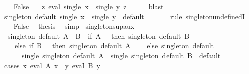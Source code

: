 \begin{isabellebody}
\ \ \isamarkupfalse%
\ False\ \isamarkupfalse%
\ {\isachardoublequoteopen}{\isasymnot}\ {\isacharparenleft}{\kern0pt}{\isasymexists}{\isacharbang}{\kern0pt}z{\isachardot}{\kern0pt}\ eval\ {\isacharparenleft}{\kern0pt}single\ x\ {\isasymsqunion}\ single\ y{\isacharparenright}{\kern0pt}\ z{\isacharparenright}{\kern0pt}{\isachardoublequoteclose}\isanewline
\ \ \ \ \isamarkupfalse%
\ blast\isanewline
\ \ \isamarkupfalse%
\ \isamarkupfalse%
\ {\isachardoublequoteopen}singleton\ default\ {\isacharparenleft}{\kern0pt}single\ x\ {\isasymsqunion}\ single\ y{\isacharparenright}{\kern0pt}\ {\isacharequal}{\kern0pt}\ default\ {\isacharparenleft}{\kern0pt}{\isacharparenright}{\kern0pt}{\isachardoublequoteclose}\isanewline
\ \ \ \ \isamarkupfalse%
\ {\isacharparenleft}{\kern0pt}rule\ singleton{\isacharunderscore}{\kern0pt}undefinedI{\isacharparenright}{\kern0pt}\isanewline
\ \ \isamarkupfalse%
\ False\ \isamarkupfalse%
\ {\isacharquery}{\kern0pt}thesis\ \isamarkupfalse%
\ simp\isanewline
{}\isamarkupfalse%
%
\endisatagproof
{\isafoldproof}%
%
\isadelimproof
\isanewline
%
\endisadelimproof
\isanewline
{}\isamarkupfalse%
\ singleton{\isacharunderscore}{\kern0pt}sup{\isacharunderscore}{\kern0pt}aux{\isacharcolon}{\kern0pt}\isanewline
\ \ {\isachardoublequoteopen}singleton\ default\ {\isacharparenleft}{\kern0pt}A\ {\isasymsqunion}\ B{\isacharparenright}{\kern0pt}\ {\isacharequal}{\kern0pt}\ {\isacharparenleft}{\kern0pt}if\ A\ {\isacharequal}{\kern0pt}\ {\isasymbottom}\ then\ singleton\ default\ B\isanewline
\ \ \ \ else\ if\ B\ {\isacharequal}{\kern0pt}\ {\isasymbottom}\ then\ singleton\ default\ A\isanewline
\ \ \ \ else\ singleton\ default\isanewline
\ \ \ \ \ \ {\isacharparenleft}{\kern0pt}single\ {\isacharparenleft}{\kern0pt}singleton\ default\ A{\isacharparenright}{\kern0pt}\ {\isasymsqunion}\ single\ {\isacharparenleft}{\kern0pt}singleton\ default\ B{\isacharparenright}{\kern0pt}{\isacharparenright}{\kern0pt}{\isacharparenright}{\kern0pt}{\isachardoublequoteclose}\ \ default\isanewline
%
\isadelimproof
%
\endisadelimproof
%
\isatagproof
{}\isamarkupfalse%
\ {\isacharparenleft}{\kern0pt}cases\ {\isachardoublequoteopen}{\isacharparenleft}{\kern0pt}{\isasymexists}{\isacharbang}{\kern0pt}x{\isachardot}{\kern0pt}\ eval\ A\ x{\isacharparenright}{\kern0pt}\ {\isasymand}\ {\isacharparenleft}{\kern0pt}{\isasymexists}{\isacharbang}{\kern0pt}y{\isachardot}{\kern0pt}\ eval\ B\ y{\isacharparenright}{\kern0pt}{\isachardoublequoteclose}{\isacharparenright}{\kern0pt}\isanewline

\end{isabellebody}
